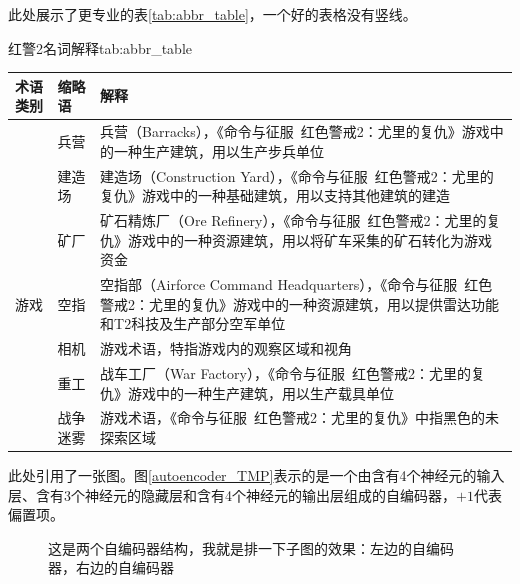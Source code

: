 \documentclass[a4paper,AutoFakeBold,oneside,12pt]{book}
\begin{document}
此处展示了更专业的表\ref{tab:abbr_table}，一个好的表格没有竖线。
\begin{bupttable}{红警2名词解释}{tab:abbr_table}
    \begin{tabularx}{\textwidth}{llX}
        \toprule
        \textbf{术语类别} & \textbf{缩略语} & \textbf{解释} \\ \midrule
        & 兵营 & 兵营（Barracks），《命令与征服\ 红色警戒2：尤里的复仇》游戏中的一种生产建筑，用以生产步兵单位 \\ \cmidrule(l){2-3}
        & 建造场 & 建造场（Construction Yard），《命令与征服\ 红色警戒2：尤里的复仇》游戏中的一种基础建筑，用以支持其他建筑的建造 \\ \cmidrule(l){2-3}
        & 矿厂 & 矿石精炼厂（Ore Refinery），《命令与征服\ 红色警戒2：尤里的复仇》游戏中的一种资源建筑，用以将矿车采集的矿石转化为游戏资金 \\ \cmidrule(l){2-3}
        游戏 & 空指 & 空指部（Airforce Command Headquarters），《命令与征服\ 红色警戒2：尤里的复仇》游戏中的一种资源建筑，用以提供雷达功能和T2科技及生产部分空军单位 \\ \cmidrule(l){2-3}
        & 相机 & 游戏术语，特指游戏内的观察区域和视角 \\ \cmidrule(l){2-3}
        & 重工 & 战车工厂（War Factory），《命令与征服\ 红色警戒2：尤里的复仇》游戏中的一种生产建筑，用以生产载具单位 \\ \cmidrule(l){2-3}
        & 战争迷雾 & 游戏术语，《命令与征服\ 红色警戒2：尤里的复仇》中指黑色的未探索区域 \\ \bottomrule
    \end{tabularx}
\end{bupttable}

此处引用了一张图。图\ref{autoencoder_TMP}表示的是一个由含有4个神经元的输入层、含有3个神经元的隐藏层和含有4个神经元的输出层组成的自编码器，$+1$代表偏置项。


\begin{figure}[!htbp]
    \centering
    \quad %
    \caption{这是两个自编码器结构，我就是排一下子图的效果：\protect{}左边的自编码器，\protect{}右边的自编码器} %
    \label{Fig:RecAccuracy} %
\end{figure}
\end{document}
